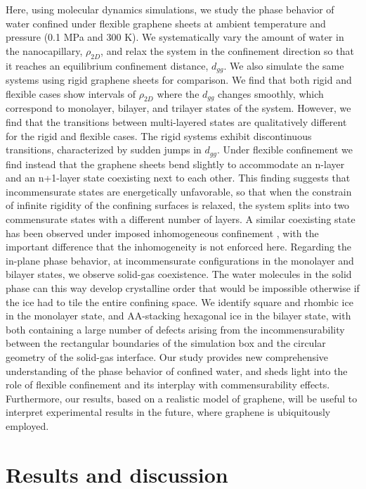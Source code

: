 \documentclass[journal=acsnano,manuscript=article]{achemso}
\begin{document}
	Here, using molecular dynamics simulations, we study the phase behavior of water confined under flexible graphene sheets at ambient temperature and pressure (0.1 MPa and 300 K). We systematically vary the amount of water in the nanocapillary, \(\rho_{2D}\), and relax the system in the confinement direction so that it reaches an equilibrium confinement distance, \(d_{gg}\). We also simulate the same systems using rigid graphene sheets for comparison. We find that both rigid and flexible cases show intervals of \(\rho_{2D}\) where the \(d_{gg}\) changes smoothly, which correspond to monolayer, bilayer, and trilayer states of the system. However, we find that the transitions between multi-layered states are qualitatively different for the rigid and flexible cases. The rigid systems exhibit discontinuous transitions, characterized by sudden jumps in \(d_{gg}\). Under flexible confinement we find instead that the graphene sheets bend slightly to accommodate an n-layer and an n+1-layer state coexisting next to each other. This finding suggests that incommensurate states are energetically unfavorable, so that when the constrain of infinite rigidity of the confining surfaces is relaxed, the system splits into two commensurate states with a different number of layers. A similar coexisting state has been observed under imposed inhomogeneous confinement \cite{Qiu2015}, with the important difference that the inhomogeneity is not enforced here. Regarding the in-plane phase behavior, at incommensurate configurations in the monolayer and bilayer states, we observe solid-gas coexistence. The water molecules in the solid phase can this way develop crystalline order that would be impossible otherwise if the ice had to tile the entire confining space. We identify square and rhombic ice in the monolayer state, and AA-stacking hexagonal ice in the bilayer state, with both containing a large number of defects arising from the incommensurability between the rectangular boundaries of the simulation box and the circular geometry of the solid-gas interface. Our study provides new comprehensive understanding of the phase behavior of confined water, and sheds light into the role of flexible confinement and its interplay with commensurability effects. Furthermore, our results, based on a realistic model of graphene, will be useful to interpret experimental results in the future, where graphene is ubiquitously employed.

\section{Results and discussion}
\end{document}

